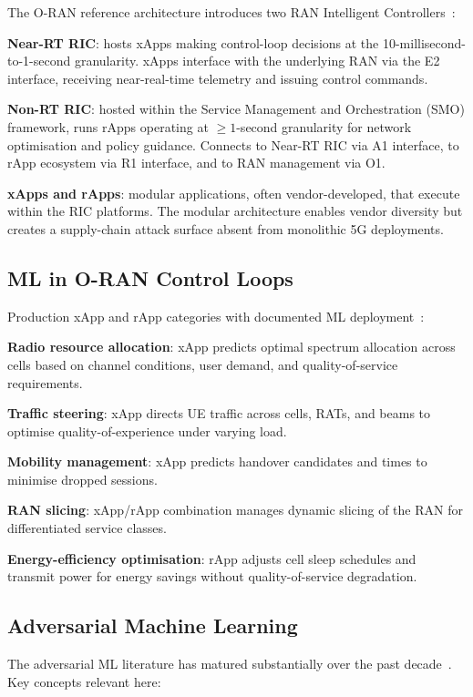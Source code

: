 \documentclass[sigconf,nonacm]{acmart}
\begin{document}
The O-RAN reference architecture introduces two RAN Intelligent
Controllers~\cite{oran2024spec}:

\textbf{Near-RT RIC}: hosts xApps making control-loop decisions
at the 10-millisecond-to-1-second granularity. xApps interface
with the underlying RAN via the E2 interface, receiving
near-real-time telemetry and issuing control commands.

\textbf{Non-RT RIC}: hosted within the Service Management and
Orchestration (SMO) framework, runs rApps operating at
$\geq 1$-second granularity for network optimisation and policy
guidance. Connects to Near-RT RIC via A1 interface, to rApp
ecosystem via R1 interface, and to RAN management via O1.

\textbf{xApps and rApps}: modular applications, often
vendor-developed, that execute within the RIC platforms. The
modular architecture enables vendor diversity but creates a
supply-chain attack surface absent from monolithic 5G
deployments.

\subsection{ML in O-RAN Control Loops}

Production xApp and rApp categories with documented ML
deployment~\cite{bonati2024oran,polese2023understanding}:

\textbf{Radio resource allocation}: xApp predicts optimal
spectrum allocation across cells based on channel conditions,
user demand, and quality-of-service requirements.

\textbf{Traffic steering}: xApp directs UE traffic across cells,
RATs, and beams to optimise quality-of-experience under varying
load.

\textbf{Mobility management}: xApp predicts handover candidates
and times to minimise dropped sessions.

\textbf{RAN slicing}: xApp/rApp combination manages dynamic
slicing of the RAN for differentiated service classes.

\textbf{Energy-efficiency optimisation}: rApp adjusts cell
sleep schedules and transmit power for energy savings without
quality-of-service degradation.

\subsection{Adversarial Machine Learning}

The adversarial ML literature has matured substantially over the
past decade~\cite{biggio2018wild,goodfellow2014fgsm,carlini2017cw}.
Key concepts relevant here:
\end{document}
